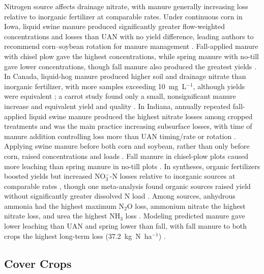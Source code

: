 \documentclass[11pt]{article}
\begin{document}
Nitrogen source affects drainage nitrate, with manure generally increasing loss relative to inorganic fertilizer at comparable rates. Under continuous corn in Iowa, liquid swine manure produced significantly greater flow-weighted concentrations and losses than UAN with no yield difference, leading authors to recommend corn--soybean rotation for manure management \parencite{Bakhsh2005}. Fall-applied manure with chisel plow gave the highest concentrations, while spring manure with no-till gave lower concentrations, though fall manure also produced the greatest yields \parencite{Bakhsh2007}. In Canada, liquid-hog manure produced higher soil and drainage nitrate than inorganic fertilizer, with more samples exceeding 10~mg~L$^{-1}$, although yields were equivalent \parencite{Elmi2005}; a carrot study found only a small, nonsignificant manure increase and equivalent yield and quality \parencite{Gordon2005}. In Indiana, annually repeated fall-applied liquid swine manure produced the highest nitrate losses among cropped treatments and was the main practice increasing subsurface losses, with time of manure addition controlling loss more than UAN timing/rate or rotation \parencite{HernandezRamirez2011}. Applying swine manure before both corn and soybean, rather than only before corn, raised concentrations and loads \parencite{Dougherty2020}. Fall manure in chisel-plow plots caused more leaching than spring manure in no-till plots \parencite{Rekha2011}. In syntheses, organic fertilizers boosted yields but increased NO$_3^-$-N losses relative to inorganic sources at comparable rates \parencite{Liu2021}, though one meta-analysis found organic sources raised yield without significantly greater dissolved N load \parencite{Christianson2015b}. Among sources, anhydrous ammonia had the highest maximum N$_2$O loss, ammonium nitrate the highest nitrate loss, and urea the highest NH$_3$ loss \parencite{Chatterjee2020b}. Modeling predicted manure gave lower leaching than UAN and spring lower than fall, with fall manure to both crops the highest long-term loss (37.2~kg~N~ha$^{-1}$) \parencite{Malone2007,Malone2007b}.

\subsection{Cover Crops}
\end{document}
